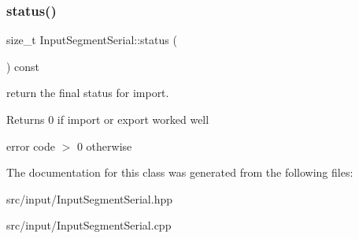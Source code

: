 \subsubsection{\texorpdfstring{status()}{status()}}
{\footnotesize\ttfamily size\+\_\+t Input\+Segment\+Serial\+::status (\begin{DoxyParamCaption}{ }\end{DoxyParamCaption}) const\hspace{0.3cm}{\ttfamily [inline]}}



return the final status for import. 

\begin{DoxyReturn}{Returns}
0 if import or export worked well 

error code $>$ 0 otherwise 
\end{DoxyReturn}


The documentation for this class was generated from the following files\+:\begin{DoxyCompactItemize}
\item 
src/input/Input\+Segment\+Serial.\+hpp\item 
src/input/Input\+Segment\+Serial.\+cpp\end{DoxyCompactItemize}
